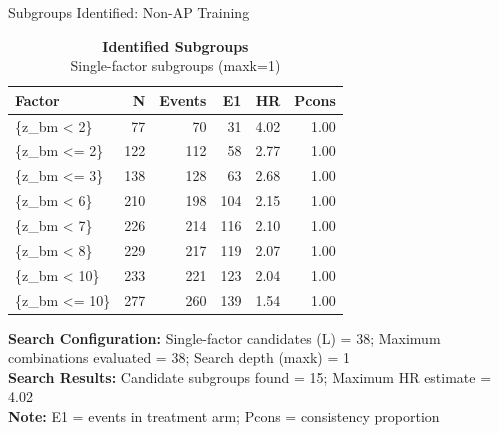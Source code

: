 \documentclass[
  ignorenonframetext,
  aspectratio=169]{beamer}
\begin{document}
\begin{frame}[shrink]{Subgroups Identified: Non-AP Training}
\label{subgroups-identified-non-ap-training}
\begin{table}[t]
\caption*{
{\fontsize{10}{13}\selectfont  \textbf{Identified Subgroups}\fontsize{9}{11}\selectfont } \\ 
{\fontsize{9}{11}\selectfont  Single-factor subgroups (maxk=1)\fontsize{9}{11}\selectfont }
} 
\fontsize{9.0pt}{11.0pt}\selectfont
\begin{tabular*}{\linewidth}{@{\extracolsep{\fill}}lrrrrr}
\toprule
Factor & N & Events & E1 & HR & Pcons \\ 
\midrule\addlinespace[2.5pt]
\{z\_bm < 2\} & 77 & 70 & 31 & 4.02 & 1.00 \\ 
\{z\_bm <= 2\} & 122 & 112 & 58 & 2.77 & 1.00 \\ 
\{z\_bm <= 3\} & 138 & 128 & 63 & 2.68 & 1.00 \\ 
\{z\_bm < 6\} & 210 & 198 & 104 & 2.15 & 1.00 \\ 
\{z\_bm < 7\} & 226 & 214 & 116 & 2.10 & 1.00 \\ 
\{z\_bm < 8\} & 229 & 217 & 119 & 2.07 & 1.00 \\ 
\{z\_bm < 10\} & 233 & 221 & 123 & 2.04 & 1.00 \\ 
\{z\_bm <= 10\} & 277 & 260 & 139 & 1.54 & 1.00 \\ 
\bottomrule
\end{tabular*}
\begin{minipage}{\linewidth}
\vspace{.05em}
\textbf{Search Configuration:} Single-factor candidates (L) = 38; Maximum combinations evaluated = 38; Search depth (maxk) = 1\\
\textbf{Search Results:} Candidate subgroups found = 15; Maximum HR estimate = 4.02\\
\textbf{Note:} E1 = events in treatment arm; Pcons = consistency proportion\\
\end{minipage}
\end{table}
\end{frame}
\end{document}
